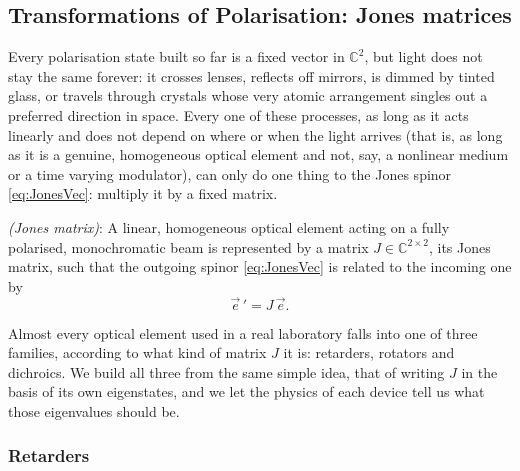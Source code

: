     \subsection{Transformations of Polarisation: Jones matrices}

        Every polarisation state built so far is a fixed vector in $\mathbb{C}^2$, but light does not stay the same forever: it crosses lenses, reflects off mirrors, is dimmed by tinted glass, or travels through crystals whose very atomic arrangement singles out a preferred direction in space. Every one of these processes, as long as it acts linearly and does not depend on where or when the light arrives (that is, as long as it is a genuine, homogeneous optical element and not, say, a nonlinear medium or a time varying modulator), can only do one thing to the Jones spinor \ref{eq:JonesVec}: multiply it by a fixed matrix.

        \begin{myDef}
            \textit{(Jones matrix)}: A linear, homogeneous optical element acting on a fully polarised, monochromatic beam is represented by a matrix $J\in\mathbb{C}^{2\times2}$, its Jones matrix, such that the outgoing spinor \ref{eq:JonesVec} is related to the incoming one by
            \begin{equation*}
                \vec{e}\,' = J\,\vec{e}.
            \end{equation*}
        \end{myDef}

        Almost every optical element used in a real laboratory falls into one of three families, according to what kind of matrix $J$ it is: retarders, rotators and dichroics. We build all three from the same simple idea, that of writing $J$ in the basis of its own eigenstates, and we let the physics of each device tell us what those eigenvalues should be.

        \subsubsection{Retarders}

